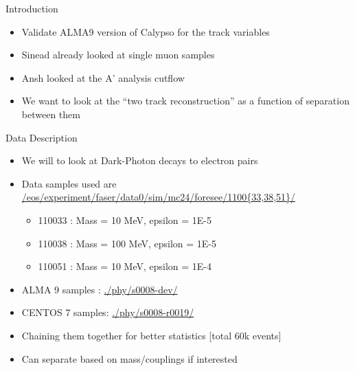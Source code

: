\begin{frame}{Introduction}
    \begin{itemize}
        \item Validate ALMA9 version of Calypso for the track variables
        \item Sinead already looked at single muon samples
        \item Ansh looked at the A' analysis cutflow
        \item We want to look at the ``two track reconstruction'' as a function of separation between them
    \end{itemize}
\end{frame}

\begin{frame}{Data Description}
    \begin{itemize}
        \item We will to look at Dark-Photon decays to electron pairs
        \item Data samples used are \href{/eos/experiment/faser/data0/sim/mc24/foresee/1100*/phy/}{/eos/experiment/faser/data0/sim/mc24/foresee/1100\{33,38,51\}/}
        \vspace{-0.25cm}\begin{itemize}
            \item 110033 : Mass = 10  MeV, epsilon = 1E-5 
            \item 110038 : Mass = 100 MeV, epsilon = 1E-5 
            \item 110051 : Mass = 10  MeV, epsilon = 1E-4 
        \end{itemize}
        \item ALMA 9 samples : \href{./phy/s0008-dev/}{./phy/s0008-dev/} 
        \item CENTOS 7 samples: \href{./phy/s0008-r0019/}{./phy/s0008-r0019/}
        \item Chaining them together  for better statistics [total 60k events]
        \item Can separate based on mass/couplings if interested
    \end{itemize}
    
\end{frame}


